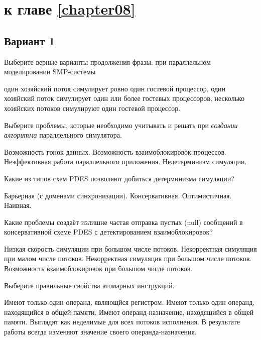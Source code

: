 \section{\Questions к главе \ref{chapter08}} %

\subsection*{Вариант 1}

\begin{questions}

\question[3] Выберите верные варианты продолжения фразы: при параллельном моделировании SMP-системы
\begin{choices}
    \choice один хозяйский поток симулирует ровно один гостевой процессор,
    \correctchoice один хозяйский поток симулирует один или более гостевых процессоров,
    \choice несколько хозяйских потоков симулируют один гостевой процессор.
\end{choices}

\question[3] Выберите проблемы, которые необходимо учитывать и решать при \textit{создании алгоритма} параллельного симулятора.
\begin{choices}
    \correctchoice Возможность гонок данных.
    \correctchoice Возможность взаимоблокировок процессов.
    \choice Неэффективная работа параллельного приложения.
    \choice Недетерминизм симуляции.
\end{choices}

\question[3] Какие из типов схем PDES позволяют добиться детерминизма симуляции?
\begin{choices}
    \correctchoice Барьерная (с доменами синхронизации).
    \choice Консервативная.
    \choice Оптимистичная.
    \choice Наивная.
\end{choices}

\question[3] Какие проблемы создаёт излишне частая отправка пустых (null) сообщений в консервативной схеме PDES с детектированием взаимоблокировок?
\begin{choices}
    \correctchoice Низкая скорость симуляции при большом числе потоков.
    \choice Некорректная симуляция при малом числе потоков.
    \choice Некорректная симуляция при большом числе потоков.
    \choice Возможность взаимоблокировок при большом числе потоков.
\end{choices}

\question[3] Выберите правильные свойства атомарных инструкций.
\begin{choices}
    \choice Имеют только один операнд, являющйся регистром.
    \choice Имеют только один операнд, находящийся в общей памяти.
    \correctchoice Имеют операнд-назначение, находящийся в общей памяти.
    \correctchoice Выглядят как неделимые для всех потоков исполнения.
    \choice В результате работы всегда изменяют значение своего операнда-назначения.
\end{choices}


\end{questions}
